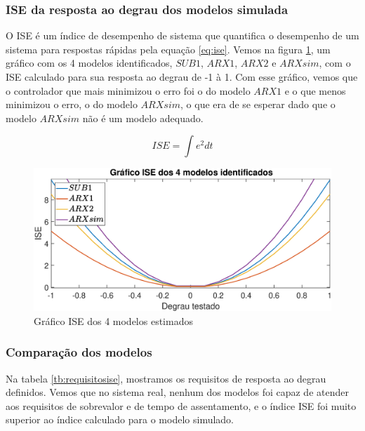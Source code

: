 \subsubsection{ISE da resposta ao degrau dos modelos simulada}

O ISE é um índice de desempenho de sistema que quantifica o desempenho de um sistema para respostas rápidas pela equação \eqref{eq:ise}. Vemos na figura \ref{fig:ise}, um gráfico com os 4 modelos identificados, $SUB1$, $ARX1$, $ARX2$ e $ARXsim$, com o ISE calculado para sua resposta ao degrau de -1 à 1. Com esse gráfico, vemos que o controlador que mais minimizou o erro foi o do modelo $ARX1$ e o que menos minimizou o erro, o do modelo $ARXsim$, o que era de se esperar dado que o modelo $ARXsim$ não é um modelo adequado. 

\begin{equation}\label{eq:ise}
ISE=\int e^2 dt
\end{equation}

\begin{figure}[htb]
	\centering
	\includegraphics[width=1\linewidth]{pasta1_figuras/ise}
	\caption[Gráfico ISE dos 4 modelos estimados]{Gráfico ISE dos 4 modelos estimados}
	\label{fig:ise}
\end{figure}

\subsubsection{Comparação dos modelos}

Na tabela \ref{tb:requisitosise}, mostramos os requisitos de resposta ao degrau definidos. Vemos que no sistema real, nenhum dos modelos foi capaz de atender aos requisitos de sobrevalor e de tempo de assentamento, e o índice ISE foi muito superior ao índice calculado para o modelo simulado.

